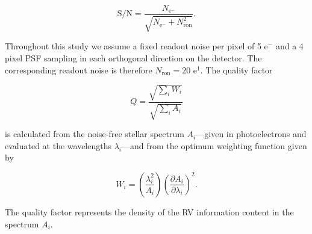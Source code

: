 \begin{equation}
  \text{S/N} = \frac{N_{\text{e}^-}}{\sqrt{N_{\text{e}^-} + N_{\text{ron}}^2}}.
\end{equation}
  
\noindent Throughout this study we assume
  a fixed readout noise per pixel of 5 e$^-$ and a 4 pixel PSF sampling in
  each orthogonal direction on the detector. The corresponding readout noise is therefore  
  $N_{\text{ron}} = 20$ e$^1$. The quality factor

\begin{equation}
  Q = \frac{\sqrt{\sum_i{W_i}}}{\sqrt{\sum_i{A_i}}}
\end{equation}

\noindent is calculated from the noise-free stellar spectrum $A_i$---given in photoelectrons
and evaluated at the wavelengths $\lambda_i$---and from the optimum weighting function given
by

\begin{equation}
  W_i = \left( \frac{\lambda_i^2}{A_i} \right) \left( \frac{\partial A_i}{\partial \lambda_i} \right)^2.
\end{equation}

\noindent The quality factor represents the density of the RV information content in the spectrum
$A_i$.

